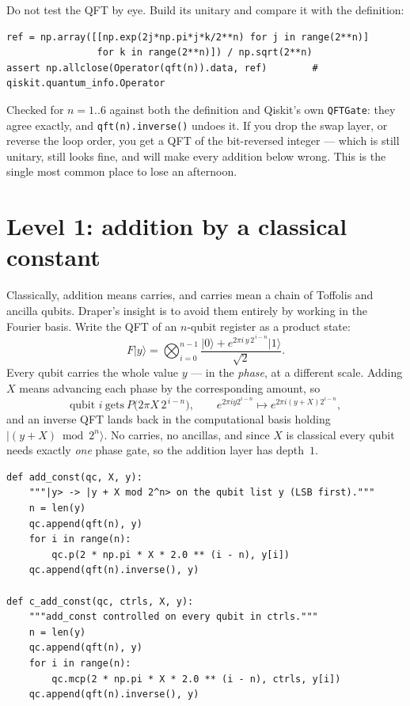 \documentclass[11pt]{article}
\renewcommand{\ket}[1]{\lvert #1 \rangle}
\newcommand{\code}[1]{\texttt{#1}}
\theoremstyle{plain}
\theoremstyle{remark}
\begin{document}
\begin{keybox}[title={Verify this before anything else}]
Do not test the QFT by eye. Build its unitary and compare it with the definition:
\begin{lstlisting}
ref = np.array([[np.exp(2j*np.pi*j*k/2**n) for j in range(2**n)]
                for k in range(2**n)]) / np.sqrt(2**n)
assert np.allclose(Operator(qft(n)).data, ref)        # qiskit.quantum_info.Operator
\end{lstlisting}
Checked for $n=1..6$ against both the definition and Qiskit's own \code{QFTGate}: they agree
exactly, and \code{qft(n).inverse()} undoes it. If you drop the swap layer, or reverse the loop
order, you get a QFT of the bit-reversed integer --- which is still unitary, still looks fine, and
will make every addition below wrong. This is the single most common place to lose an afternoon.
\end{keybox}

\section{Level 1: addition by a classical constant}\label{im:sec:l1}

Classically, addition means carries, and carries mean a chain of Toffolis and ancilla qubits.
Draper's insight \cite{draper} is to avoid them entirely by working in the Fourier basis. Write the
QFT of an $n$-qubit register as a product state:
\[
F\ket y=\bigotimes_{i=0}^{n-1}\frac{\ket0+e^{2\pi i\,y\,2^{\,i-n}}\ket1}{\sqrt2}.
\]
Every qubit carries the whole value $y$ --- in the \emph{phase}, at a different scale. Adding $X$
means advancing each phase by the corresponding amount, so
\[
\text{qubit } i \ \text{gets}\ P\big(2\pi X\,2^{\,i-n}\big),
\qquad
e^{2\pi iy2^{i-n}}\longmapsto e^{2\pi i(y+X)2^{i-n}},
\]
and an inverse QFT lands back in the computational basis holding $\ket{(y+X)\bmod 2^n}$. No
carries, no ancillas, and since $X$ is classical every qubit needs exactly \emph{one} phase gate,
so the addition layer has depth~$1$.

\begin{lstlisting}
def add_const(qc, X, y):
    """|y> -> |y + X mod 2^n> on the qubit list y (LSB first)."""
    n = len(y)
    qc.append(qft(n), y)
    for i in range(n):
        qc.p(2 * np.pi * X * 2.0 ** (i - n), y[i])
    qc.append(qft(n).inverse(), y)

def c_add_const(qc, ctrls, X, y):
    """add_const controlled on every qubit in ctrls."""
    n = len(y)
    qc.append(qft(n), y)
    for i in range(n):
        qc.mcp(2 * np.pi * X * 2.0 ** (i - n), ctrls, y[i])
    qc.append(qft(n).inverse(), y)
\end{lstlisting}
\end{document}
